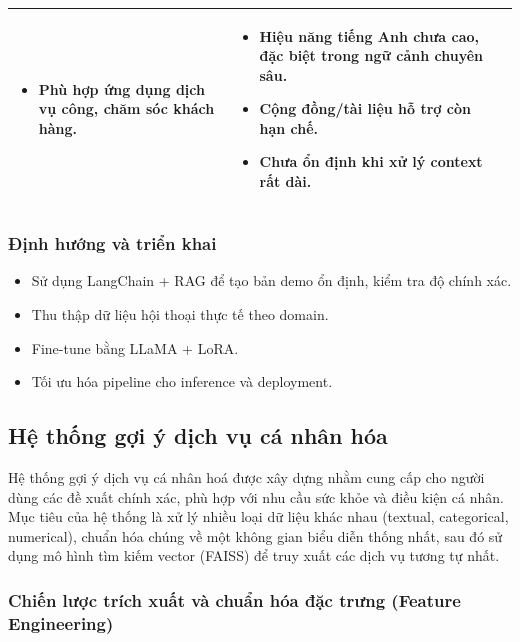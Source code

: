 \begin{center}
\begin{tabular}{|p{3cm}|p{6cm}|p{6cm}|}
\begin{itemize}[leftmargin=*]
    \item Phù hợp ứng dụng dịch vụ công, chăm sóc khách hàng.
\end{itemize}
&
\begin{itemize}[leftmargin=*]
    \item Hiệu năng tiếng Anh chưa cao, đặc biệt trong ngữ cảnh chuyên sâu.
    \item Cộng đồng/tài liệu hỗ trợ còn hạn chế.
    \item Chưa ổn định khi xử lý context rất dài.
\end{itemize}
\\
\hline
\end{tabular}
\end{center}



\subsubsection{Định hướng và triển khai}
\begin{itemize}
    \item Sử dụng LangChain + RAG để tạo bản demo ổn định, kiểm tra độ chính xác.  
    \item Thu thập dữ liệu hội thoại thực tế theo domain.  
    \item Fine-tune bằng LLaMA + LoRA.  
    \item Tối ưu hóa pipeline cho inference và deployment.  
\end{itemize}




\subsection{Hệ thống gợi ý dịch vụ cá nhân hóa}

Hệ thống gợi ý dịch vụ cá nhân hoá được xây dựng nhằm cung cấp cho người dùng các đề xuất chính xác, phù hợp với nhu cầu sức khỏe và điều kiện cá nhân. Mục tiêu của hệ thống là xử lý nhiều loại dữ liệu khác nhau (textual, categorical, numerical), chuẩn hóa chúng về một không gian biểu diễn thống nhất, sau đó sử dụng mô hình tìm kiếm vector (FAISS) để truy xuất các dịch vụ tương tự nhất.

\subsubsection{Chiến lược trích xuất và chuẩn hóa đặc trưng (Feature Engineering)}

